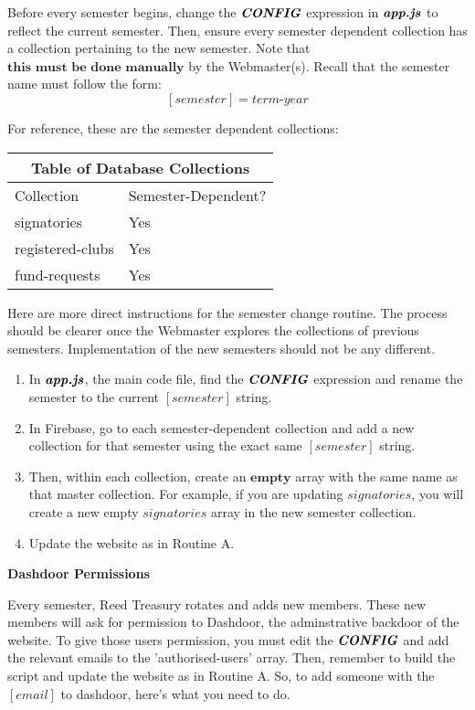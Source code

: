 \documentclass[a4paper]{article}
\begin{document}
Before every semester begins, change the $\textbf{\textit{CONFIG}}$ expression in $\textbf{\textit{app.js}}$ to reflect the current semester. Then, ensure every semester dependent collection has a collection pertaining to the new semester. Note that $\textbf{this must be done manually}$ by the Webmaster(s). Recall that the semester name must follow the form:
$$[semester] = \textit{term-year}$$

For reference, these are the semester dependent collections:

\begin{center}
\begin{tabular}{ |p{4cm}||p{4cm}|  }
 \hline
 \multicolumn{2}{|c|}{Table of Database Collections} \\
 \hline
 Collection & Semester-Dependent? \\
 \hline
 signatories & Yes \\
 registered-clubs & Yes \\
 fund-requests & Yes \\
 \hline
\end{tabular}
\end{center}

Here are more direct instructions for the semester change routine. The process should be clearer once the Webmaster explores the collections of previous semesters. Implementation of the new semesters should not be any different.

\begin{enumerate}
  \item In $\textbf{\textit{app.js}}$, the main code file, find the $\textbf{\textit{CONFIG}}$ expression and rename the semester to the current $[semester]$ string.
  \item In Firebase, go to each semester-dependent collection and add a new collection for that semester using the exact same $[semester]$ string.
  \item Then, within each collection, create an $\textbf{empty}$ array with the same name as that master collection. For example, if you are updating $signatories$, you will create a new empty $signatories$ array in the new semester collection.
  \item Update the website as in Routine A.
\end{enumerate}

\begin{center}
\textbf{Dashdoor Permissions}
\end{center}

Every semester, Reed Treasury rotates and adds new members. These new members will ask for permission to Dashdoor, the adminstrative backdoor of the website. To give those users permission, you must edit the $\textbf{\textit{CONFIG}}$ and add the relevant emails to the 'authorised-users' array. Then, remember to build the script and update the website as in Routine A. So, to add someone with the $[email]$ to dashdoor, here's what you need to do.
\end{document}
